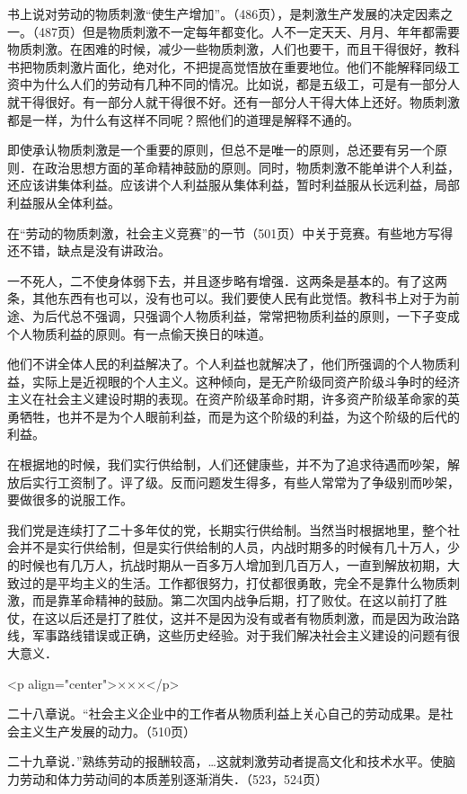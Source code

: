 书上说对劳动的物质刺激“使生产增加”。（486页），是刺激生产发展的决定因素之一。（487页）但是物质刺激不一定每年都变化。人不一定天天、月月、年年都需要物质刺激。在困难的时候，减少一些物质刺激，人们也要干，而且干得很好，教科书把物质刺激片面化，绝对化，不把提高觉悟放在重要地位。他们不能解释同级工资中为什么人们的劳动有几种不同的情况。比如说，都是五级工，可是有一部分人就干得很好。有一部分人就干得很不好。还有一部分人干得大体上还好。物质刺激都是一样，为什么有这样不同呢？照他们的道理是解释不通的。

即使承认物质刺激是一个重要的原则，但总不是唯一的原则，总还要有另一个原则．在政治思想方面的革命精神鼓励的原则。同时，物质刺激不能单讲个人利益，还应该讲集体利益。应该讲个人利益服从集体利益，暂时利益服从长远利益，局部利益服从全体利益。

在“劳动的物质刺激，社会主义竞赛”的一节（501页）中关于竞赛。有些地方写得还不错，缺点是没有讲政治。

一不死人，二不使身体弱下去，并且逐步略有增强．这两条是基本的。有了这两条，其他东西有也可以，没有也可以。我们要使人民有此觉悟。教科书上对于为前途、为后代总不强调，只强调个人物质利益，常常把物质利益的原则，一下子变成个人物质利益的原则。有一点偷天换日的味道。

他们不讲全体人民的利益解决了。个人利益也就解决了，他们所强调的个人物质利益，实际上是近视眼的个人主义。这种倾向，是无产阶级同资产阶级斗争时的经济主义在社会主义建设时期的表现。在资产阶级革命时期，许多资产阶级革命家的英勇牺牲，也并不是为个人眼前利益，而是为这个阶级的利益，为这个阶级的后代的利益。

在根据地的时候，我们实行供给制，人们还健康些，并不为了追求待遇而吵架，解放后实行工资制了。评了级。反而问题发生得多，有些人常常为了争级别而吵架，要做很多的说服工作。

我们党是连续打了二十多年仗的党，长期实行供给制。当然当时根据地里，整个社会并不是实行供给制，但是实行供给制的人员，内战时期多的时候有几十万人，少的时候也有几万人，抗战时期从一百多万人增加到几百万人，一直到解放初期，大致过的是平均主义的生活。工作都很努力，打仗都很勇敢，完全不是靠什么物质刺激，而是靠革命精神的鼓励。第二次国内战争后期，打了败仗。在这以前打了胜仗，在这以后还是打了胜仗，这并不是因为没有或者有物质刺激，而是因为政治路线，军事路线错误或正确，这些历史经验。对于我们解决社会主义建设的问题有很大意义．

<p align="center">×××</p>

二十八章说。“社会主义企业中的工作者从物质利益上关心自己的劳动成果。是社会主义生产发展的动力。（510页）

二十九章说．”熟练劳动的报酬较高，…这就刺激劳动者提高文化和技术水平。使脑力劳动和体力劳动间的本质差别逐渐消失．（523，524页）

